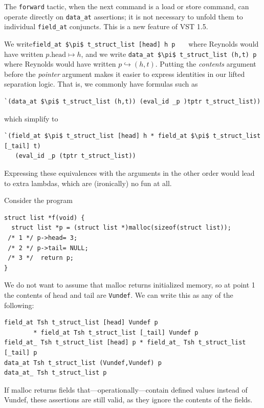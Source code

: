 \documentclass[12pt,fleqn,openany,oneside,showtrims]{memoir}
\begin{document}
The \lstinline{forward} tactic, when the next command is a load
or store command, can operate directly on \lstinline{data_at}
assertions; it is not necessary to unfold them to individual
\lstinline{field_at} conjuncts.  This is a new feature
of VST 1.5.

We write\newline \lstinline{field_at $\pi$ t_struct_list [head] h p}
\ \ \ where Reynolds would have written $p.\mathrm{head}\mapsto h$,
and we write 
\lstinline{data_at $\pi$ t_struct_list (h,t) p}
where Reynolds would have written $p\hookrightarrow(h,t)$.
Putting the \emph{contents} argument before the \emph{pointer}
argument makes it easier to express identities in our lifted
separation logic.  That is, we commonly have formulas such as
\begin{lstlisting}
`(data_at $\pi$ t_struct_list (h,t)) (eval_id _p )tptr t_struct_list))
\end{lstlisting}
\vspace{-\baselineskip}
which simplify to 
\begin{lstlisting}
`(field_at $\pi$ t_struct_list [head] h * field_at $\pi$ t_struct_list [_tail] t)
   (eval_id _p (tptr t_struct_list))
\end{lstlisting}
\vspace{-\baselineskip}
Expressing these equivalences with the arguments in the other order
would lead to extra lambdas, which are
(ironically) no fun at all.

Consider the program
\begin{lstlisting}
struct list *f(void) {
  struct list *p = (struct list *)malloc(sizeof(struct list));
 /* 1 */ p->head= 3;
 /* 2 */ p->tail= NULL;
 /* 3 */  return p;
}
\end{lstlisting}
We do not want to assume that malloc returns initialized memory,
so at point 1 the contents of head and tail are \lstinline{Vundef}.
We can write this as any of the following:
\begin{lstlisting}
field_at Tsh t_struct_list [head] Vundef p 
        * field_at Tsh t_struct_list [_tail] Vundef p
field_at_ Tsh t_struct_list [head] p * field_at_ Tsh t_struct_list [_tail] p
data_at Tsh t_struct_list (Vundef,Vundef) p
data_at_ Tsh t_struct_list p
\end{lstlisting}
If malloc returns fields that---operationally---contain defined
values instead of Vundef, these assertions are still valid,
as they ignore the contents of the fields.
\end{document}
